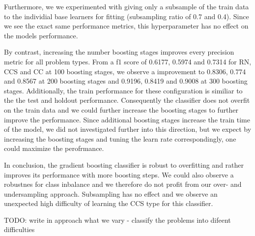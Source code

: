 Furthermore, we we experimented with giving only a subsample of the train data to the individial base learners for fitting (subsampling ratio of 0.7 and 0.4). Since we see the exact same performance metrics, this hyperparameter has no effect on the models performance.

By contrast, increasing the number boosting stages improves every precision metric for all problem types. From a f1 score of 0.6177, 0.5974 and 0.7314 for RN, CCS and CC at 100 boosting stages, we observe a improvement to 0.8306, 0.774 and 0.8567 at 200 boosting stages and 0.9196, 0.8419 and 0.9008 at 300 boosting stages. Additionally, the train performance for these configuration is similiar to the the test and holdout performance. Consequently the classifier does not overfit on the train data and we could further increase the boosting stages to further improve the performance. Since additional boosting stages increase the train time of the model, we did not investigated further into this direction, but we expect by increasing the boosting stages and tuning the learn rate correspondingly, one could maximize the perofrmance. 

In conclusion, the gradient boosting classifier is robust to overfitting and rather improves its performance with more boosting steps. We could also observe a robustnes for class inbalance and we therefore do not profit from our over- and undersampling approach. Subsampling has no effect and we observe an unexpected high difficulty of learning the CCS type for this classifier.




TODO: write in approach what we vary
- classify the problems into difeent difficulties